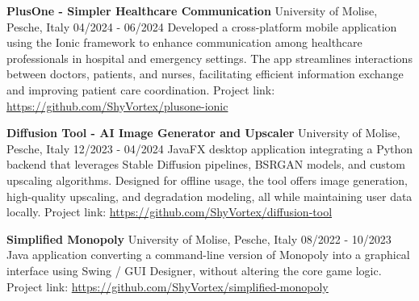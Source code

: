 \documentclass[a4paper, 10pt]{article}
\begin{document}
{\projHeading
{\fontsize{13pt}{13pt}\textbf{PlusOne - Simpler Healthcare Communication}}
{University of Molise, Pesche, Italy} {04/2024 - 06/2024}
{Developed a cross-platform mobile application using the Ionic framework to enhance communication among healthcare professionals in hospital and emergency settings. The app streamlines interactions between doctors, patients, and nurses, facilitating efficient information exchange and improving patient care coordination.}
{Project link: \url{https://github.com/ShyVortex/plusone-ionic}}\vspace{0.65em}

\projHeading
{\fontsize{13pt}{13pt}\textbf{Diffusion Tool - AI Image Generator and Upscaler}}
{University of Molise, Pesche, Italy} {12/2023 - 04/2024}
{JavaFX desktop application integrating a Python backend that leverages Stable Diffusion pipelines, BSRGAN models, and custom upscaling algorithms. Designed for offline usage, the tool offers image generation, high-quality upscaling, and degradation modeling, all while maintaining user data locally.}
{Project link: \url{https://github.com/ShyVortex/diffusion-tool}}
\itemListStart
\itemListEnd
\vspace{0.65em}

\projHeading
{\fontsize{13pt}{13pt}\textbf{Simplified Monopoly}}
{University of Molise, Pesche, Italy} {08/2022 - 10/2023}
{Java application converting a command-line version of Monopoly into a graphical interface using Swing / GUI Designer, without altering the core game logic.}
{Project link: \url{https://github.com/ShyVortex/simplified-monopoly}}
\itemListStart
\itemListEnd
}
\end{document}
